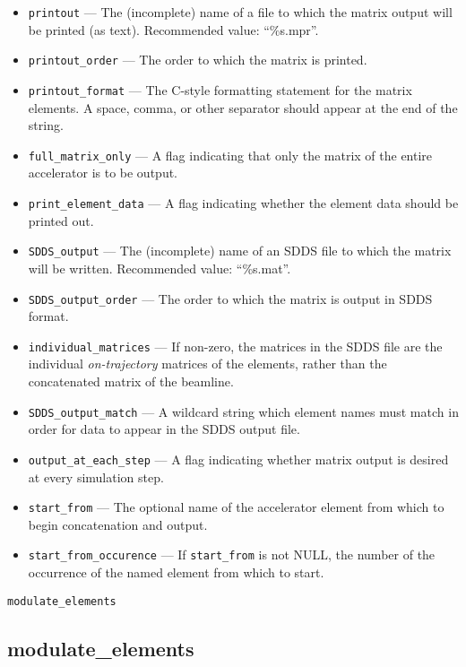 \documentclass[11pt]{article}
\begin{document}
\begin{itemize}
\item \verb|printout| --- The (incomplete) name of a file to which the 
matrix output will be printed (as text).  Recommended value: ``\%s.mpr''.
\item \verb|printout_order| --- The order to which the matrix is printed.
\item \verb|printout_format| --- The C-style formatting statement for the matrix elements. A space, comma, or other separator
  should appear at the end of the string.
\item \verb|full_matrix_only| --- A flag indicating that only the matrix of
the entire accelerator is to be output.
\item \verb|print_element_data| --- A flag indicating whether the element data should be printed out.
\item \verb|SDDS_output| --- The (incomplete) name of an SDDS 
file to which the matrix will be written.  Recommended value: ``\%s.mat''.
\item \verb|SDDS_output_order| --- The order to which the matrix is output in SDDS format.
\item \verb|individual_matrices| --- If non-zero, the matrices in the SDDS file are the individual
{\em on-trajectory} matrices of the elements, rather than the concatenated matrix of the beamline.
\item \verb|SDDS_output_match| --- A wildcard string which element names must match in
order for data to appear in the SDDS output file.
\item \verb|output_at_each_step| --- A flag indicating whether matrix output
is desired at every simulation step.
\item \verb|start_from| --- The optional name of the accelerator element
from which to begin concatenation and output.
\item \verb|start_from_occurence| --- If \verb|start_from| is not NULL, the
number of the occurrence of the named element from which to start.
\end{itemize}

\newpage
\begin{center}{\Large\verb|modulate_elements|}\end{center}
\subsection{modulate\_elements\label{subsec:modulateelements}}
\end{document}
